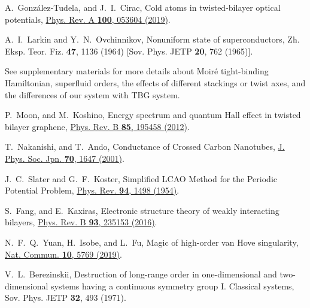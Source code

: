 \documentclass[twocolumn,english,prl,floatfix,citeautoscript,nofootinbib]{revtex4}
\begin{document}
\begin{thebibliography}{999}
 A.~Gonz\'alez-Tudela, and J.~I.~Cirac, Cold
atoms in twisted-bilayer optical potentials, \href{https://doi.org/10.1103/PhysRevA.100.053604}%
{Phys. Rev. A \textbf{100}, 053604 (2019)}.



 A.~I.~Larkin and Y.~N.~Ovchinnikov, Nonuniform state of
superconductors, Zh. Eksp. Teor. Fiz. \textbf{47}, 1136 (1964) [Sov. Phys.
JETP \textbf{20}, 762 (1965)].


 See supplementary materials for more details about Moir\'e
tight-binding Hamiltonian,
superfluid orders, the effects of
different stackings or twist axes, and the differences of our system with
TBG system.





 P.~Moon, and M.~Koshino, Energy spectrum and
quantum Hall effect in twisted bilayer graphene, \href{https://doi.org/10.1103/PhysRevB.85.195458}%
{Phys. Rev. B \textbf{85}, 195458 (2012)}.

 T.~Nakanishi, and T.~Ando, Conductance of Crossed
Carbon Nanotubes, \href{https://doi.org/10.1143/JPSJ.70.1647}{J. Phys. Soc.
Jpn. \textbf{70}, 1647 (2001)}.

 J.~C.~Slater and G.~F.~Koster, Simplified LCAO
Method for the Periodic Potential Problem, \href{https://doi.org/10.1103/PhysRev.94.1498}%
{Phys. Rev. \textbf{94}, 1498 (1954)}.

 S.~Fang, and E.~Kaxiras, Electronic structure
theory of weakly interacting bilayers, \href{https://doi.org/10.1103/PhysRevB.93.235153}%
{Phys. Rev. B \textbf{93}, 235153 (2016)}.



 N.~F.~Q.~Yuan, H.~Isobe, and L.~Fu, Magic of
high-order van Hove singularity, \href{https://doi.org/10.1038/s41467-019-13670-9}%
{Nat. Commun. \textbf{10}, 5769 (2019)}. %



 V.~L.~Berezinskii, Destruction of
long-range order in one-dimensional and two-dimensional systems having a
continuous symmetry group I. Classical systems, Sov. Phys. JETP \textbf{32},
493 (1971).


\end{thebibliography}
\end{document}
